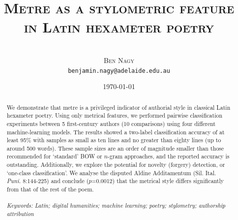 \documentclass[11pt,a4paper]{scrartcl} %
\begin{document}
\title{\rmfamily\normalfont\textsc{Metre as a stylometric feature in Latin hexameter poetry}}
\author{\phantom{xxx}\\\textsc{Ben Nagy}\\\small{\texttt{benjamin.nagy@adelaide.edu.au}}}
\date{\normalsize{\today}}

\maketitle

\begin{abstract}
\noindent
We demonstrate that metre is a privileged indicator of authorial style in classical Latin hexameter poetry. Using only metrical features, we performed pairwise classification experiments between 5 first-century authors (10 comparisons) using four different machine-learning models. The results showed a two-label classification accuracy of at least 95\% with samples as small as ten lines and no greater than eighty lines (up to around 500 words). These sample sizes are an order of magnitude smaller than those recommended for `standard' BOW or $n$-gram approaches, and the reported accuracy is outstanding. Additionally, we explore the potential for novelty (forgery) detection, or `one-class classification'. We analyse the disputed Aldine Additamentum (Sil. Ital. \textit{Puni.} 8:144-225) and conclude ($p$=0.0012) that the metrical style differs significantly from that of the rest of the poem.\\
\phantom{xxx}\\
\noindent\textit{Keywords: Latin; digital humanities; machine learning; poetry; stylometry; authorship attribution}
\end{abstract}

\setlength{\parindent}{0.3in}
\end{document}
